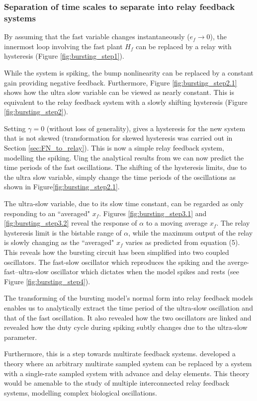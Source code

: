 \documentclass[a4paper, 12pt]{article}
\begin{document}
\newpage
\subsubsection{Separation of time scales to separate into relay feedback systems}
By assuming that the fast variable changes instantaneously ($e_f\rightarrow0$), the innermost loop involving the fast plant $H_f$ can be replaced by a relay with hysteresis (Figure \ref{fig:bursting_step1}). 

While the system is spiking, the bump nonlinearity can be replaced by a constant gain providing negative feedback. Furthermore, Figure \ref{fig:bursting_step2.1} shows how the ultra slow variable can be viewed as nearly constant. This is equivalent to the relay feedback system with a slowly shifting hysteresis (Figure \ref{fig:bursting_step2}). 

Setting $\gamma = 0$ (without loss of generality), gives a hysteresis for the new system that is not skewed (transformation for skewed hysteresis was carried out in Section \ref{sec:FN_to_relay}). This is now a simple relay feedback system, modelling the spiking. Uing the analytical results from \cite{astrom1995} we can now predict the time periods of the fast oscillations. The shifting of the hysteresis limits, due to the ultra slow variable, simply change the time periods of the oscillations as shown in Figure\ref{fig:bursting_step2.1}.

The ultra-slow variable, due to its slow time constant, can be regarded as only responding to an ``averaged" $x_f$. Figures \ref{fig:bursting_step3.1} and \ref{fig:bursting_step3.2} reveal the response of $\alpha$ to a moving average $x_f$. The relay hysteresis limit is the bistable range of $\alpha$, while the maximum output of the relay is slowly changing as the ``averaged" $x_f$ varies as predicted from equation (5). This reveals how the bursting circuit has been simplified into two coupled oscillators. The fast-slow oscillator which reproduces the spiking and the averge-fast--ultra-slow oscillator which dictates when the model spikes and rests (see Figure \ref{fig:bursting_step4}). 

The transforming of the bursting model's normal form into relay feedback models enables us to analytically extract the time period of the ultra-slow oscillation and that of the fast oscillation. It also revealed how the two oscillators are linked and revealed how the duty cycle during spiking subtly changes due to the ultra-slow parameter. 

Furthermore, this is a step towards multirate feedback systems. \cite{kranc} developed a theory where an arbitrary multirate sampled system can be replaced by a system with a single-rate sampled system with advance and delay elements. This theory would be amenable to the study of multiple interconnected relay feedback systems, modelling complex biological oscillations. 
\end{document}
